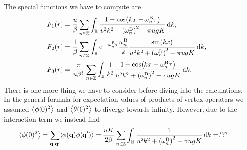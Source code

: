 \documentclass[english, parskip=full]{scrartcl}
\begin{document}
The special functions we have to compute are
\begin{align}
F_1(r) &= \frac{u}{\beta} \sum_{n\in\mathbb{Z}} \intr{\frac{1 - \cos\kla*{kx - \omega_n^\B\tau}}{u^2k^2 + \kla*{\omega_n^\B}^2 - \pi ugK}}{k},\\
F_2(r) &= \frac{1}{\beta} \sum_{n\in\mathbb{Z}} \intr{\powe{-\i\omega_n^\B\tau} \frac{\omega_n^\B}{k} \frac{\sin(kx)}{u^2k^2 + \kla*{\omega_n^\B}^2 - \pi ugK}}{k},\\
F_3(r) &= \frac{\pi}{u\beta^3} \sum_{n\in\mathbb{Z}} \intr{ \frac{1}{k^2} \frac{1 - \cos\kla*{kx - \omega_n^\B \tau}}{u^2k^2 + \kla*{\omega_n^\B}^2 - \pi ugK}}{k}.
\end{align}
There is one more thing we have to consider before diving into the calculations.
In the general formula for expectation values of products of vertex operators we assumed $\bra*{\phi(0)^2}$ and $\bra*{\theta(0)^2}$ to diverge towards infinity.
However, due to the interaction term we instead find
\begin{align}
\bra*{\phi(0)^2} &= \sum_{\textbf{q},\textbf{q}'} \bra*{\phi(\textbf{q})\phi(\textbf{q}')} = \frac{uK}{2\beta} \sum_{n\in\mathbb{Z}} \intr{\frac{1}{u^2k^2 + \kla*{\omega_n^\B}^2 - \pi ugK}}{k} = ???
\end{align}



\end{document}
